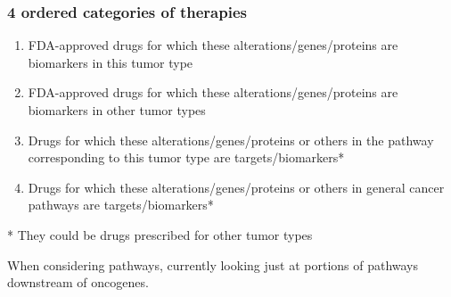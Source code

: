 \documentclass{beamer}
\begin{document}
\begin{frame}
\frametitle{4 ordered categories of therapies}

\begin{enumerate}
\item FDA-approved drugs for which these alterations/genes/proteins are biomarkers {\color{red}in this tumor type}
\item FDA-approved drugs for which these alterations/genes/proteins are biomarkers {\color{red}in other tumor types}
\item Drugs for which these alterations/genes/proteins or others in the {\color{red}pathway corresponding to this tumor type} are targets/biomarkers*
\item Drugs for which these alterations/genes/proteins or others in {\color{red}general cancer pathways} are targets/biomarkers*

\end{enumerate}

\vspace{0.5cm}

* They could be drugs prescribed for other tumor types

\vspace{0.4cm}

When considering pathways, currently looking just at portions of pathways downstream of {\color{red}oncogenes}.

\end{frame}

\end{document}
